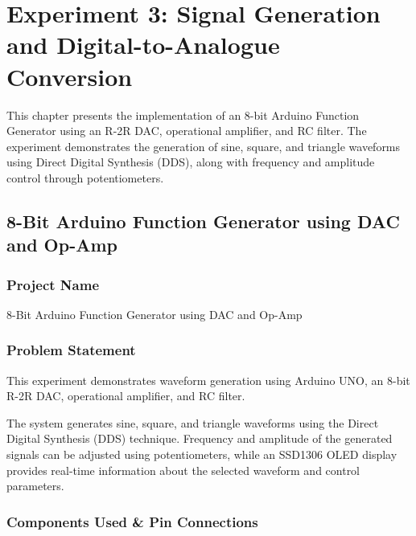 
\chapter{Experiment 3: Signal Generation and Digital-to-Analogue Conversion}

This chapter presents the implementation of an 8-bit Arduino Function Generator using an R-2R DAC, operational amplifier, and RC filter. The experiment demonstrates the generation of sine, square, and triangle waveforms using Direct Digital Synthesis (DDS), along with frequency and amplitude control through potentiometers.


\section{8-Bit Arduino Function Generator using DAC and Op-Amp}


\subsection{Project Name}

8-Bit Arduino Function Generator using DAC and Op-Amp


\subsection{Problem Statement}

This experiment demonstrates waveform generation using Arduino UNO, an 8-bit R-2R DAC, operational amplifier, and RC filter.

The system generates sine, square, and triangle waveforms using the Direct Digital Synthesis (DDS) technique. Frequency and amplitude of the generated signals can be adjusted using potentiometers, while an SSD1306 OLED display provides real-time information about the selected waveform and control parameters.


\subsection{Components Used \& Pin Connections}

